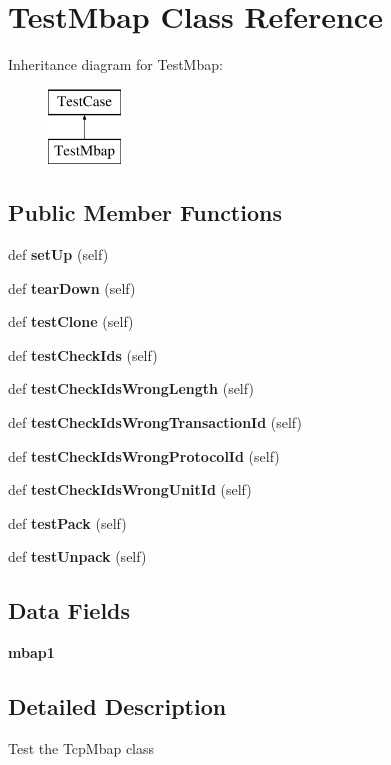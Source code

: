\section{Test\+Mbap Class Reference}
\label{classtests_1_1unittest__modbus__tcp_1_1_test_mbap}
Inheritance diagram for Test\+Mbap\+:\begin{figure}[H]
\begin{center}
\leavevmode
\includegraphics[height=2.000000cm]{classtests_1_1unittest__modbus__tcp_1_1_test_mbap}
\end{center}
\end{figure}
\subsection*{Public Member Functions}
\begin{DoxyCompactItemize}
\item 
def {\bf set\+Up} (self)
\item 
def {\bf tear\+Down} (self)
\item 
def {\bf test\+Clone} (self)
\item 
def {\bf test\+Check\+Ids} (self)
\item 
def {\bf test\+Check\+Ids\+Wrong\+Length} (self)
\item 
def {\bf test\+Check\+Ids\+Wrong\+Transaction\+Id} (self)
\item 
def {\bf test\+Check\+Ids\+Wrong\+Protocol\+Id} (self)
\item 
def {\bf test\+Check\+Ids\+Wrong\+Unit\+Id} (self)
\item 
def {\bf test\+Pack} (self)
\item 
def {\bf test\+Unpack} (self)
\end{DoxyCompactItemize}
\subsection*{Data Fields}
\begin{DoxyCompactItemize}
\item 
{\bf mbap1}
\end{DoxyCompactItemize}


\subsection{Detailed Description}
\begin{DoxyVerb}Test the TcpMbap class\end{DoxyVerb}
 

